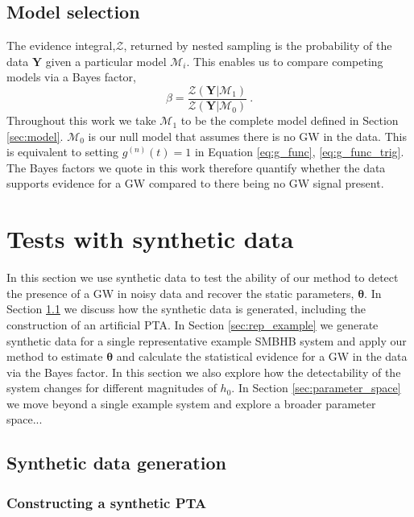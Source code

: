 \documentclass[fleqn,usenatbib,useAMS]{mnras}
\begin{document}


\subsection{Model selection}\label{sec:model_selection}
The evidence integral,$\mathcal{Z}$, returned by nested sampling is the probability of the data $\boldsymbol{Y}$ given a particular model $\mathcal{M}_i$. This enables us to compare competing models via a Bayes factor,
\begin{equation}
	\beta = \frac{\mathcal{Z}(\boldsymbol{Y} | \mathcal{M}_1)}{\mathcal{Z}(\boldsymbol{Y} | \mathcal{M}_0)} \ . \label{eq:bayes}
\end{equation}
Throughout this work we take $\mathcal{M}_1$ to be the complete model defined in Section \ref{sec:model}. $\mathcal{M}_0$ is our null model that assumes there is no GW in the data. This is equivalent to setting $g^{(n)}(t)=1$ in Equation \ref{eq:g_func}, \ref{eq:g_func_trig}. The Bayes factors we quote in this work therefore quantify whether the data supports evidence for a GW compared to there being no GW signal present.



\section{Tests with synthetic data} \label{sec:testing}
In this section we use synthetic data to test the ability of our method to detect the presence of a GW in noisy data and recover the static parameters, $\boldsymbol{\theta}$. In Section \ref{sec:synth_data} we discuss how the synthetic data is generated, including the construction of an artificial PTA. In Section \ref{sec:rep_example} we generate synthetic data for a single representative example SMBHB system and apply our method to estimate $\boldsymbol{\theta}$ and calculate the statistical evidence for a GW in the data via the Bayes factor. In this section we also explore how the detectability of the system changes for different magnitudes of $h_0$. In Section \ref{sec:parameter_space} we move beyond a single example system and explore a broader parameter space...


\subsection{Synthetic data generation} \label{sec:synth_data}

\subsubsection{Constructing a synthetic PTA}\label{sec:synt_pta}
\end{document}
